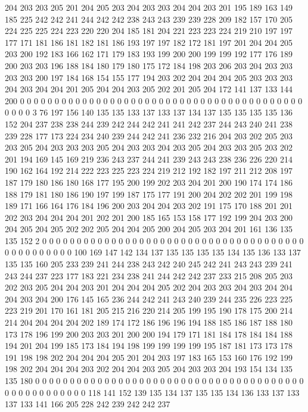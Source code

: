 204 203 203 205 201 204 205 203 204 203 203 204 204 203 201 195 189 163 149 185
225 242 242 241 244 242 242 238 243 243 239 239 228 209 182 157 170 205 224 225
225 224 223 220 220 204 185 181 204 221 223 223 224 219 210 197 197 177 171 181
186 181 182 181 186 193 197 197 182 172 181 197 201 204 204 205 203 200 192 183
166 162 171 179 183 193 199 200 200 199 199 192 177 176 189 200 203 203 196 188
184 180 179 180 175 172 184 198 203 206 203 204 203 203 203 203 200 197 184 168
154 155 177 194 203 202 204 204 204 205 203 203 203 204 203 204 204 201 205 204
204 203 205 202 201 205 204 172 141 137 133 144 200 0 0 0 0 0 0 0
0 0 0 0 0 0 0 0 0 0 0 0 0 0 0 0 0 0 0 0
0 0 0 0 0 0 0 0 0 0 0 0 0 0 0 0 0 0 3 76
197 156 140 135 135 133 137 133 137 134 137 135 135 135 135 136 152 204 237 238
238 244 239 242 244 242 241 241 242 237 244 243 240 241 238 239 228 177 173 224
234 240 239 244 242 241 236 232 216 204 203 202 205 203 203 205 204 203 203 203
205 204 203 203 204 203 205 204 203 203 205 203 202 201 194 169 145 169 219 236
243 237 244 241 239 243 243 238 236 226 220 214 190 162 164 192 214 222 223 225
223 224 219 212 192 182 197 211 212 208 197 187 179 180 186 180 168 177 195 200
199 202 203 204 201 200 190 174 174 186 188 179 181 180 186 190 197 199 187 175
177 191 200 204 202 202 201 199 198 189 171 166 164 176 184 196 200 203 204 204
203 202 191 175 170 188 201 201 202 203 204 204 204 201 202 201 200 185 165 153
158 177 192 199 204 203 200 204 205 204 205 202 202 205 204 204 205 200 204 205
203 204 201 161 136 135 135 152 2 0 0 0 0 0 0 0 0 0 0 0
0 0 0 0 0 0 0 0 0 0 0 0 0 0 0 0 0 0 0 0
0 0 0 0 0 0 0 0 0 0 0 0 0 0 0 0 0 100 169 147
142 134 137 135 135 135 135 134 135 136 133 137 135 135 160 205 233 239 241 244
238 243 242 240 245 242 241 243 243 239 241 243 244 237 223 177 183 221 234 238
241 244 242 242 237 233 215 208 205 203 202 203 205 204 204 203 201 204 204 204
205 202 204 203 203 204 203 204 204 204 203 204 200 176 145 165 236 244 242 241
243 240 239 244 235 226 223 225 223 219 201 170 161 181 205 215 216 220 214 205
199 195 190 178 175 200 214 214 204 204 204 204 202 189 174 172 186 196 196 194
188 185 186 187 188 180 173 178 196 199 200 203 203 201 200 200 194 179 171 181
184 178 184 184 188 194 201 204 199 185 173 184 194 198 199 199 199 199 195 187
181 173 173 178 191 198 198 202 204 204 204 205 201 204 203 197 183 165 153 160
176 192 199 198 202 204 204 204 203 202 204 204 203 205 204 203 203 204 193 154
134 135 135 180 0 0 0 0 0 0 0 0 0 0 0 0 0 0 0 0
0 0 0 0 0 0 0 0 0 0 0 0 0 0 0 0 0 0 0 0
0 0 0 0 0 0 0 0 0 0 0 0 0 0 0 118 141 152 139 135
134 137 135 135 134 136 133 137 133 137 133 141 166 205 228 242 239 242 242 237
